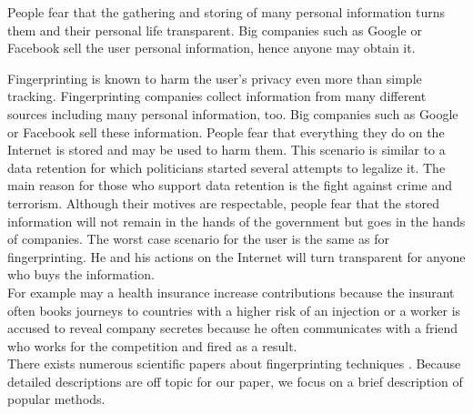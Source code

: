 	
	
	People fear that the gathering and storing of many personal information turns them and their personal life transparent. Big companies such as Google or Facebook sell the user personal information, hence anyone may obtain it. 
	
	
	Fingerprinting is known to harm the user's privacy even more than simple tracking. Fingerprinting companies collect information from many different sources including many personal information, too. Big companies such as Google or Facebook sell these information. People fear that everything they do on the Internet is stored and may be used to harm them. This scenario is similar to a data retention for which politicians started several attempts to legalize it. The main reason for those who support data retention is the fight against crime and terrorism. Although their motives are respectable, people fear that the stored information will not remain in the hands of the government but goes in the hands of companies. The worst case scenario for the user is the same as for fingerprinting. He and his actions on the Internet will turn transparent for anyone who buys the information. \\
	
	For example may a health insurance increase contributions because the insurant often books journeys to countries with a higher risk of an injection or a worker is accused to reveal company secretes because he often communicates with a friend who works for the competition and fired as a result. \\
	
	
	
	
	There exists numerous scientific papers about fingerprinting techniques \cite{paulstone_historysniffing, MBYS11, Nikiforakis:2013:CME:2497621.2498133, Eckersley:2010:UYW:1881151.1881152, MS12, olejnik:hal-00747841}. Because detailed descriptions are off topic for our paper, we focus on a brief description of popular methods. %


